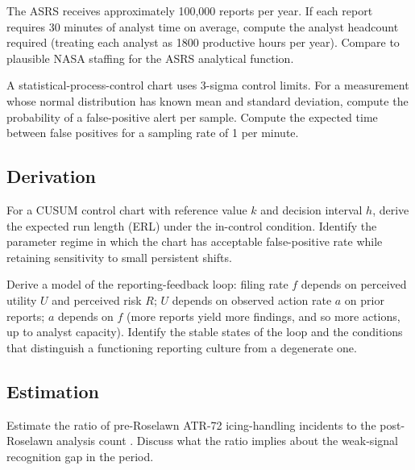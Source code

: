 \begin{exercise}
The ASRS receives approximately 100,000 reports per year. If each report requires 30 minutes of analyst time on average, compute the analyst headcount required (treating each analyst as 1800 productive hours per year). Compare to plausible NASA staffing for the ASRS analytical function.
\end{exercise}

\begin{exercise}
A statistical-process-control chart uses 3-sigma control limits. For a measurement whose normal distribution has known mean and standard deviation, compute the probability of a false-positive alert per sample. Compute the expected time between false positives for a sampling rate of 1 per minute.
\end{exercise}

\subsection*{Derivation}

\begin{exercise}
For a CUSUM control chart with reference value $k$ and decision interval $h$, derive the expected run length (ERL) under the in-control condition. Identify the parameter regime in which the chart has acceptable false-positive rate while retaining sensitivity to small persistent shifts.
\end{exercise}

\begin{exercise}
Derive a model of the reporting-feedback loop: filing rate $f$ depends on perceived utility $U$ and perceived risk $R$; $U$ depends on observed action rate $a$ on prior reports; $a$ depends on $f$ (more reports yield more findings, and so more actions, up to analyst capacity). Identify the stable states of the loop and the conditions that distinguish a functioning reporting culture from a degenerate one.
\end{exercise}

\subsection*{Estimation}

\begin{exercise}
Estimate the ratio of pre-Roselawn ATR-72 icing-handling incidents to the post-Roselawn analysis count \cite{acc:ntsb-aar96-01}. Discuss what the ratio implies about the weak-signal recognition gap in the period.
\end{exercise}

